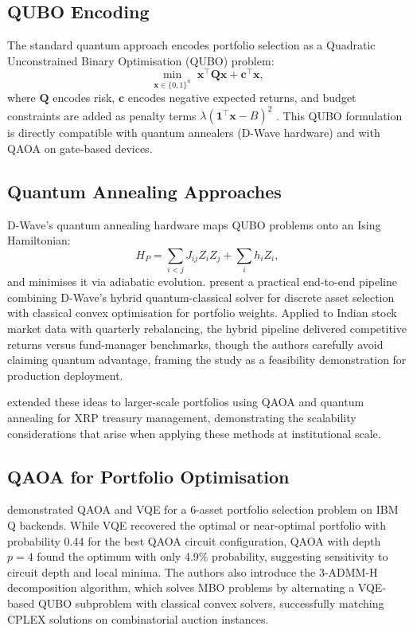 \documentclass[12pt,a4paper]{article}
\begin{document}
\subsection{QUBO Encoding}

The standard quantum approach encodes portfolio selection as a Quadratic Unconstrained Binary Optimisation (QUBO) problem:
\[
\min_{\mathbf{x} \in \{0,1\}^n} \; \mathbf{x}^\top \mathbf{Q} \mathbf{x} + \mathbf{c}^\top \mathbf{x},
\]
where $\mathbf{Q}$ encodes risk, $\mathbf{c}$ encodes negative expected returns, and budget constraints are added as penalty terms $\lambda (\mathbf{1}^\top \mathbf{x} - B)^2$ \citep{orus_quantum_2019, gong_quantum_2026-1}. This QUBO formulation is directly compatible with quantum annealers (D-Wave hardware) and with QAOA on gate-based devices.

\subsection{Quantum Annealing Approaches}

D-Wave's quantum annealing hardware maps QUBO problems onto an Ising Hamiltonian:
\[
H_P = \sum_{i<j} J_{ij} Z_i Z_j + \sum_i h_i Z_i,
\]
and minimises it via adiabatic evolution. \citet{morapakula_end--end_2026} present a practical end-to-end pipeline combining D-Wave's hybrid quantum-classical solver for discrete asset selection with classical convex optimisation for portfolio weights. Applied to Indian stock market data with quarterly rebalancing, the hybrid pipeline delivered competitive returns versus fund-manager benchmarks, though the authors carefully avoid claiming quantum advantage, framing the study as a feasibility demonstration for production deployment.

\citet{wall_quantum-enhanced_2025} extended these ideas to larger-scale portfolios using QAOA and quantum annealing for XRP treasury management, demonstrating the scalability considerations that arise when applying these methods at institutional scale.

\subsection{QAOA for Portfolio Optimisation}

\citet{egger_quantum_2020} demonstrated QAOA and VQE for a 6-asset portfolio selection problem on IBM Q backends. While VQE recovered the optimal or near-optimal portfolio with probability 0.44 for the best QAOA circuit configuration, QAOA with depth $p=4$ found the optimum with only 4.9\% probability, suggesting sensitivity to circuit depth and local minima. The authors also introduce the 3-ADMM-H decomposition algorithm, which solves MBO problems by alternating a VQE-based QUBO subproblem with classical convex solvers, successfully matching CPLEX solutions on combinatorial auction instances.
\end{document}
